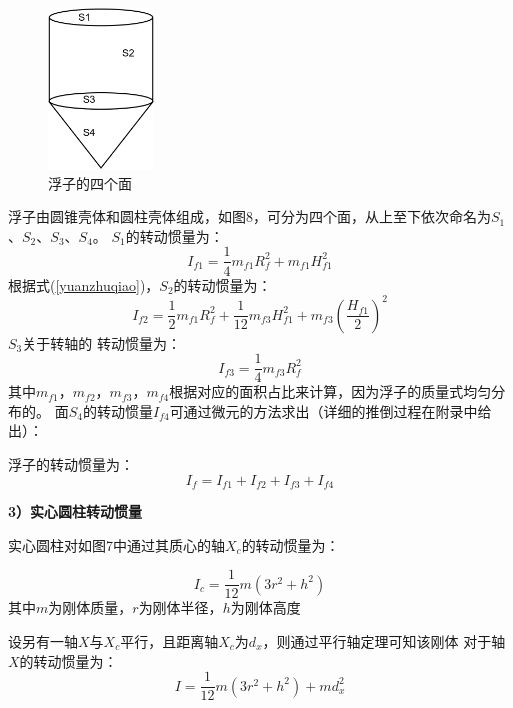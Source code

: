 \documentclass{my_paper}
\begin{document}
\begin{figure}[!h]
    \centering
    \includegraphics[width=0.25\textwidth]{四面.png}
    \caption{浮子的四个面}
    \label{fig:my_label}
\end{figure}
浮子由圆锥壳体和圆柱壳体组成，如图8，可分为四个面，从上至下依次命名为$S_1$、$S_2$、$S_3$、$S_4$。
$S_1$的转动惯量为：
\begin{equation}
    I_{f1}=\frac{1}{4}m_{f1}R_f^{2}+m_{f1}H_{f1}^2
    \label{mian 1}
\end{equation}
根据式(\ref{yuanzhuqiao})，$S_2$的转动惯量为：
\begin{equation}
    I_{f2}=\frac{1}{2}m_{f1} R_f^{2}+\frac{1}{12}m_{f3} H_{f1}^2+m_{f3}(\frac{H_{f1}}{2})^2
    \label{mian 1}
\end{equation}
$S_3$关于转轴的
转动惯量为：
\begin{equation}
I_{f3}=\frac{1}{4}m_{f3}R_f^{2}\label{mian 3}
\end{equation}
其中$m_{f1}$，$m_{f2}$，$m_{f3}$，$m_{f4}$根据对应的面积占比来计算，因为浮子的质量式均匀分布的。
面$S_4$的转动惯量$I_{f4}$可通过微元的方法求出（详细的推倒过程在附录中给出）：


浮子的转动惯量为：
\begin{equation}
    I_{f} = I_{f1} + I_{f2} + I_{f3} + I_{f4}
\end{equation}

\textbf{3）实心圆柱转动惯量}

实心圆柱对如图7中通过其质心的轴$X_c$的转动惯量为：

\begin{equation}
    I_c=\frac{1}{12}m (3r^{2} + h^2)
\end{equation}
其中$m$为刚体质量，$r$为刚体半径，$h$为刚体高度

设另有一轴$X$与$X_c$平行，且距离轴$X_c$为$d_{x}$，则通过平行轴定理可知该刚体
对于轴$X$的转动惯量为：
\begin{equation}\label{37}
    I=\frac{1}{12}m (3r^{2} + h^2)+m d_{x}^2
\end{equation}
\end{document}
